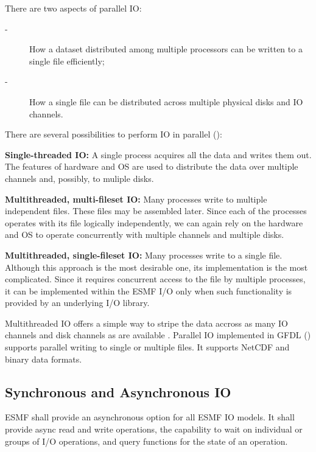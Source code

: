 There are two aspects of  parallel IO:

\begin{description}
\item[-] How a dataset distributed among multiple processors can be
written to a single file efficiently;

\item[-] How a single file can be distributed across multiple physical
disks and IO channels.
\end{description}
 
There are several possibilities to perform IO in parallel (\cite{MPI-2}):
\begin{description}
\item {\bf Single-threaded IO:} A single process acquires all the data and
writes them out. The features of hardware and OS are used to distribute the 
data over multiple channels and, possibly, to muliple disks.

\item {\bf Multithreaded, multi-fileset IO:} Many processes write to
multiple independent files. These files may be assembled later. Since each of 
the processes operates with its file logically independently, we can again 
rely on the hardware and OS to operate concurrently with multiple channels and 
multiple disks. 
 
\item {\bf Multithreaded, single-fileset IO:} Many processes write to a
single file. Although this approach is the most desirable one, its 
implementation is the most complicated. Since it requires concurrent access 
to the file by multiple processes, it can be implemented within the ESMF I/O 
only when such functionality is provided by an underlying I/O library. 
\end{description}

Multithreaded IO offers a simple way to stripe the data accross as many
IO channels and disk channels as are available \cite{MPI-2, 
Balaji_Parallel_IO_1999, Balaji_Parallel_IO_2000}. Parallel IO implemented in 
GFDL (\cite{mpp_io}) supports parallel writing to single or multiple files. 
It supports NetCDF and binary data formats.

\subsection{Synchronous and Asynchronous IO}

ESMF shall provide an asynchronous option for all ESMF IO models.  It
shall provide async read and write operations, the capability to wait
on individual or groups of I/O operations, and query functions for the
state of an operation.


